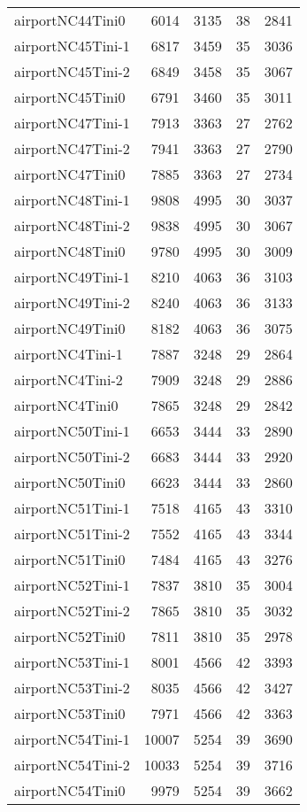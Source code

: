 \documentclass[../../../thesis.tex]{subfiles}
\begin{document}
\begin{longtable}{lrrrr}
airportNC44Tini0 & 6014 & 3135 & 38 & 2841 \\
airportNC45Tini-1 & 6817 & 3459 & 35 & 3036 \\
airportNC45Tini-2 & 6849 & 3458 & 35 & 3067 \\
airportNC45Tini0 & 6791 & 3460 & 35 & 3011 \\
airportNC47Tini-1 & 7913 & 3363 & 27 & 2762 \\
airportNC47Tini-2 & 7941 & 3363 & 27 & 2790 \\
airportNC47Tini0 & 7885 & 3363 & 27 & 2734 \\
airportNC48Tini-1 & 9808 & 4995 & 30 & 3037 \\
airportNC48Tini-2 & 9838 & 4995 & 30 & 3067 \\
airportNC48Tini0 & 9780 & 4995 & 30 & 3009 \\
airportNC49Tini-1 & 8210 & 4063 & 36 & 3103 \\
airportNC49Tini-2 & 8240 & 4063 & 36 & 3133 \\
airportNC49Tini0 & 8182 & 4063 & 36 & 3075 \\
airportNC4Tini-1 & 7887 & 3248 & 29 & 2864 \\
airportNC4Tini-2 & 7909 & 3248 & 29 & 2886 \\
airportNC4Tini0 & 7865 & 3248 & 29 & 2842 \\
airportNC50Tini-1 & 6653 & 3444 & 33 & 2890 \\
airportNC50Tini-2 & 6683 & 3444 & 33 & 2920 \\
airportNC50Tini0 & 6623 & 3444 & 33 & 2860 \\
airportNC51Tini-1 & 7518 & 4165 & 43 & 3310 \\
airportNC51Tini-2 & 7552 & 4165 & 43 & 3344 \\
airportNC51Tini0 & 7484 & 4165 & 43 & 3276 \\
airportNC52Tini-1 & 7837 & 3810 & 35 & 3004 \\
airportNC52Tini-2 & 7865 & 3810 & 35 & 3032 \\
airportNC52Tini0 & 7811 & 3810 & 35 & 2978 \\
airportNC53Tini-1 & 8001 & 4566 & 42 & 3393 \\
airportNC53Tini-2 & 8035 & 4566 & 42 & 3427 \\
airportNC53Tini0 & 7971 & 4566 & 42 & 3363 \\
airportNC54Tini-1 & 10007 & 5254 & 39 & 3690 \\
airportNC54Tini-2 & 10033 & 5254 & 39 & 3716 \\
airportNC54Tini0 & 9979 & 5254 & 39 & 3662 \\

\end{longtable}
\end{document}
